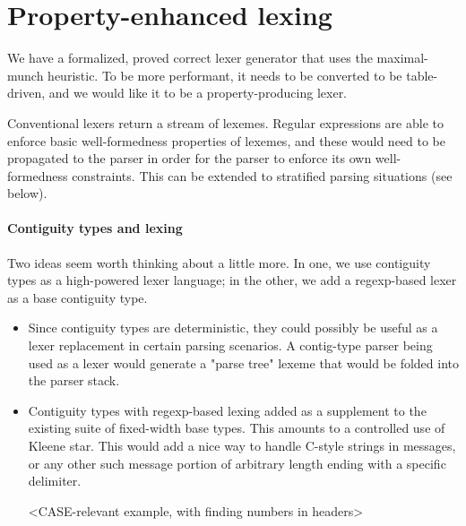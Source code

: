 \documentclass{article}
\begin{document}
\section{Property-enhanced lexing}

   We have a formalized, proved correct lexer generator that uses the
   maximal-munch heuristic. To be more performant, it needs to be
   converted to be table-driven, and we would like it to be a
   property-producing lexer.

   Conventional lexers return a stream of lexemes. Regular expressions
   are able to enforce basic well-formedness properties of lexemes,
   and these would need to be propagated to the parser in order for
   the parser to enforce its own well-formedness constraints. This can
   be extended to stratified parsing situations (see below).


\paragraph{Contiguity types and lexing}

   Two ideas seem worth thinking about a little more. In one, we use
   contiguity types as a high-powered lexer language; in the other, we
   add a regexp-based lexer as a base contiguity type.

\begin{itemize}

\item Since contiguity types are deterministic, they could possibly be
      useful as a lexer replacement in certain parsing scenarios. A
      contig-type parser being used as a lexer would generate a "parse
      tree" lexeme that would be folded into the parser stack.

\item Contiguity types with regexp-based lexing added as a supplement
      to the existing suite of fixed-width base types. This amounts to
      a controlled use of Kleene star. This would add a nice way to
      handle C-style strings in messages, or any other such message
      portion of arbitrary length ending with a specific delimiter.

      <CASE-relevant example, with finding numbers in headers>
\end{itemize}

 
\end{document}
